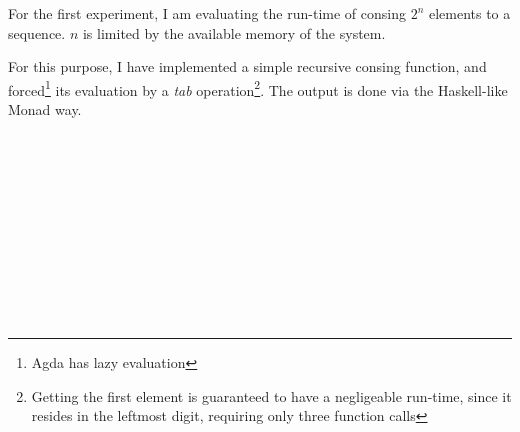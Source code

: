 \documentclass[12pt,twoside,notitlepage]{report}
\begin{document}
For the first experiment, I am evaluating the run-time of consing $2^n$ elements to a sequence. $n$ is limited by the available memory of the system. 

For this purpose, I have implemented a simple recursive consing function, and forced\footnote{Agda has lazy evaluation} its evaluation by a \textit{tab} operation\footnote{Getting the first element is guaranteed to have a negligeable run-time, since it resides in the leftmost digit, requiring only three function calls}. The output is done via the Haskell-like Monad way.

\begin{code}
\\
\>[0]\<[4]%
\>[4] \AgdaSymbol{:} \AgdaSymbol{(} \AgdaSymbol{:} \AgdaSymbol{)}    \AgdaSymbol{(} \AgdaSymbol{)}\<%
\\
\>[0]\<[4]%
\>[4]  \AgdaSymbol{=} \<%
\\
\>[0]\<[4]%
\>[4] \AgdaSymbol{(} \AgdaSymbol{)} \AgdaSymbol{=} \AgdaSymbol{(} \AgdaSymbol{)}  \AgdaSymbol{(} \AgdaSymbol{)}\<%
\\
\end{code}

\begin{code}
\\
\>[0]\<[4]%
\>[4] \AgdaSymbol{=} \AgdaSymbol{(} \AgdaSymbol{(} \AgdaSymbol{)} \AgdaPostulate{>>=}\<%
\\
\>[4]\<[12]%
\>[12]    \AgdaSymbol{(} \AgdaSymbol{)} \AgdaPostulate{>>=}\<%
\\
\>[4]\<[12]%
\>[12]    \AgdaSymbol{(} \AgdaSymbol{(}\AgdaSymbol{(} \AgdaFunction{!} \AgdaSymbol{))))} \AgdaPostulate{>>=}\<%
\\
\>[4]\<[12]%
\>[12]    \AgdaSymbol{)))}\<%
\\
\end{code} 
\end{document}
